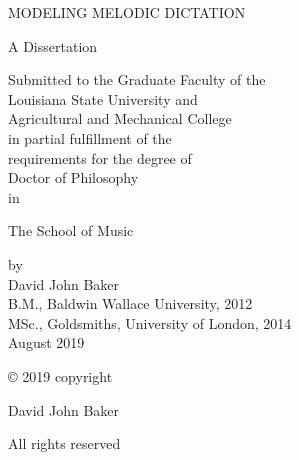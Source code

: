 \documentclass[12pt,]{book}
\title{}
\author{}
\date{2019-06-06}
\begin{document}
\thispagestyle{empty}
\begin{center}
MODELING MELODIC DICTATION\\
\end{center}

\begin{center}
A Dissertation

Submitted to the Graduate Faculty of the\\
Louisiana State University and\\
Agricultural and Mechanical College\\
in partial fulfillment of the\\
requirements for the degree of\\
Doctor of Philosophy\\

in

The School of Music
\end{center}

\begin{center}
by\\
David John Baker\\
B.M., Baldwin Wallace University, 2012\\
MSc., Goldsmiths, University of London, 2014\\
August 2019\\
\end{center}


\setlength{\abovedisplayskip}{-5pt}
\setlength{\abovedisplayshortskip}{-5pt}


\newpage

\thispagestyle{plain}

© 2019 copyright

David John Baker

All rights reserved


\let\cleardoublepage\clearpage

\end{document}
